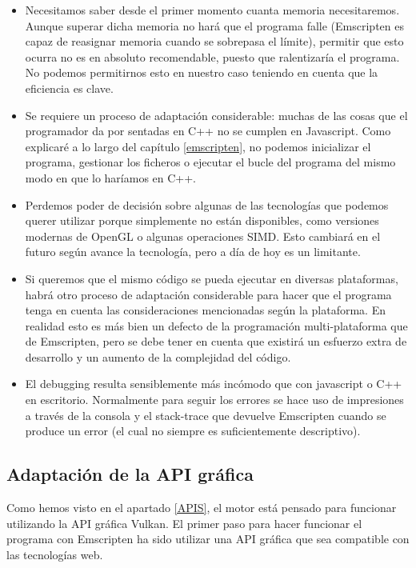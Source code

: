 \begin{itemize}
    \item Necesitamos saber desde el primer momento cuanta memoria necesitaremos. Aunque superar dicha memoria no hará que el programa falle (Emscripten es capaz de reasignar memoria cuando se sobrepasa el límite), permitir que esto ocurra no es en absoluto recomendable, puesto que ralentizaría el programa. No podemos permitirnos esto en nuestro caso teniendo en cuenta que la eficiencia es clave.
    \item Se requiere un proceso de adaptación considerable: muchas de las cosas que el programador da por sentadas en C++ no se cumplen en Javascript. Como explicaré a lo largo del capítulo \ref{emscripten}, no podemos inicializar el programa, gestionar los ficheros o ejecutar el bucle del programa del mismo modo en que lo haríamos en C++. 
    \item Perdemos poder de decisión sobre algunas de las tecnologías que podemos querer utilizar porque simplemente no están disponibles, como versiones modernas de OpenGL o algunas operaciones SIMD. Esto cambiará en el futuro según avance la tecnología, pero a día de hoy es un limitante.
    \item Si queremos que el mismo código se pueda ejecutar en diversas plataformas, habrá otro proceso de adaptación considerable para hacer que el programa tenga en cuenta las consideraciones mencionadas según la plataforma. En realidad esto es más bien un defecto de la programación multi-plataforma que de Emscripten, pero se debe tener en cuenta que existirá un esfuerzo extra de desarrollo y un aumento de la complejidad del código.
    \item El debugging resulta sensiblemente más incómodo que con javascript o C++ en escritorio. Normalmente para seguir los errores se hace uso de impresiones a través de la consola y el stack-trace que devuelve Emscripten cuando se produce un error (el cual no siempre es suficientemente descriptivo).
\end{itemize}

\subsection{Adaptación de la API gráfica}
Como hemos visto en el apartado \ref{APIS}, el motor está pensado para funcionar utilizando la API gráfica Vulkan. El primer paso para hacer funcionar el programa con Emscripten ha sido utilizar una API gráfica que sea compatible con las tecnologías web.

